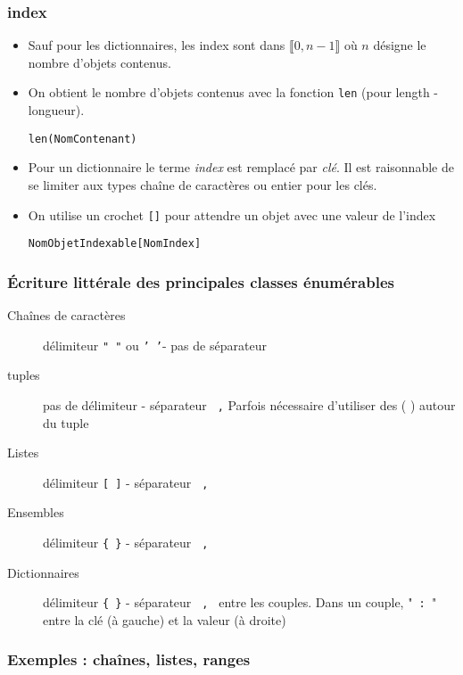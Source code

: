 \begin{frame}
  \frametitle{index}
  \begin{itemize}
    \item Sauf pour les dictionnaires, les index sont dans $\llbracket 0, n-1 \rrbracket$ où $n$ désigne le nombre d'objets contenus.
    \item On obtient le nombre d'objets contenus avec la fonction \texttt{len} (pour length -longueur).
      \begin{center}
        \texttt{len(NomContenant)}
      \end{center}
    \item Pour un dictionnaire le terme \emph{index} est remplacé par \emph{clé}. Il est raisonnable de se limiter aux types chaîne de caractères ou entier pour les clés.
    \item On utilise un crochet \texttt{[]} pour attendre un objet avec une valeur de l'index
      \begin{center}
        \texttt{NomObjetIndexable[NomIndex]}
      \end{center}
  \end{itemize}
\end{frame}

\begin{frame}
  \frametitle{\'Ecriture littérale des principales classes énumérables}
  \begin{description}
    \item [Chaînes de caractères] délimiteur \texttt{" "} ou \texttt{' '}- pas de séparateur
    \item [tuples] pas de délimiteur - séparateur \texttt{ ,}\newline
    Parfois nécessaire d'utiliser des ( ) autour du tuple
    \item [Listes] délimiteur \texttt{[ ]} - séparateur \texttt{ , }
    \item [Ensembles] délimiteur \texttt{\{ \}} - séparateur \texttt{ ,}
    \item [Dictionnaires] délimiteur \texttt{\{ \}} - séparateur \texttt{ , } entre les couples.\newline
    Dans un couple, "\texttt{ : }" entre la clé (à gauche) et la valeur (à droite)
  \end{description}
\end{frame}

\begin{frame}
  \frametitle{Exemples : chaînes, listes, ranges}
    
\end{frame}

